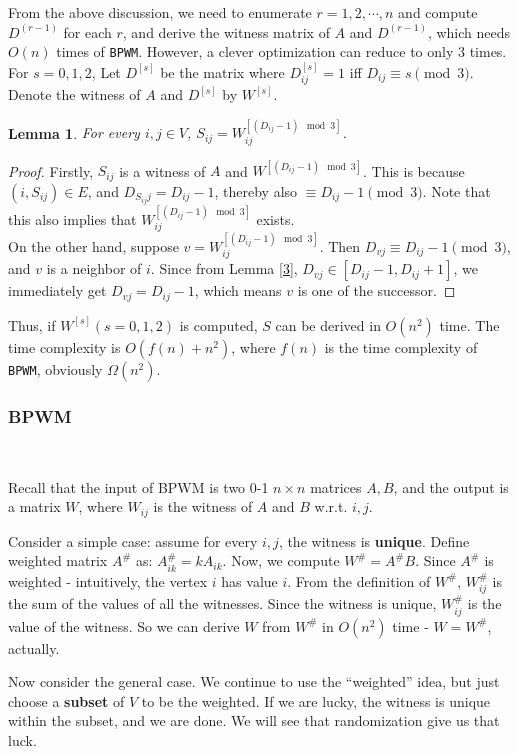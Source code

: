 \documentclass[11pt]{article}
\theoremstyle{plain}
\newtheorem{lemma}{Lemma}[section]
\begin{document}
From the above discussion, we need to enumerate $r=1,2,\cdots,n$ and compute $D^{(r-1)}$ for each $r$, and derive the witness matrix of $A$ and $D^{(r-1)}$, which needs $O(n)$ times of \texttt{BPWM}. However, a clever optimization can reduce to only $3$ times. For $s=0,1,2$, Let $D^{[s]}$ be the matrix where $D^{[s]}_{ij}=1$ iff $D_{ij}\equiv s\pmod 3$. Denote the witness of $A$ and $D^{[s]}$ by $W^{[s]}$.

\begin{lemma}
\label{5}
For every $i,j\in V$, $S_{ij}=W^{[(D_{ij}-1)\mod 3]}_{ij}$.
\end{lemma}
\begin{proof}
Firstly, $S_{ij}$ is a witness of $A$ and $W^{[(D_{ij}-1)\mod 3]}$. This is because $(i,S_{ij})\in E$, and $D_{S_{ij}j}=D_{ij}-1$, thereby also $\equiv D_{ij}-1\pmod 3$. Note that this also implies that $W^{[(D_{ij}-1)\mod 3]}_{ij}$ exists.\\
On the other hand, suppose $v=W^{[(D_{ij}-1)\mod 3]}_{ij}$. Then $D_{vj}\equiv D_{ij}-1\pmod 3$, and $v$ is a neighbor of $i$. Since from Lemma \ref{3}, $D_{vj}\in [D_{ij}-1,D_{ij}+1]$, we immediately get $D_{vj}=D_{ij}-1$, which means $v$ is one of the successor.
\end{proof}

Thus, if $W^{[s]}(s=0,1,2)$ is computed, $S$ can be derived in $O(n^2)$ time. The time complexity is $O(f(n)+n^2)$, where $f(n)$ is the time complexity of \texttt{BPWM}, obviously $\Omega(n^2)$.

\subsubsection{BPWM}
\label{sec:bpwm}\

Recall that the input of BPWM is two 0-1 $n\times n$ matrices $A,B$, and the output is a matrix $W$, where $W_{ij}$ is the witness of $A$ and $B$ w.r.t. $i,j$.

Consider a simple case: assume for every $i,j$, the witness is \textbf{unique}. Define weighted matrix $A^{\#}$ as: $A^{\#}_{ik}=kA_{ik}$. Now, we compute $W^{\#}=A^{\#}B$. Since $A^{\#}$ is weighted - intuitively, the vertex $i$ has value $i$. From the definition of $W^{\#}$, $W^{\#}_{ij}$ is the sum of the values of all the witnesses. Since the witness is unique, $W^{\#}_{ij}$ is the value of the witness. So we can derive $W$ from $W^{\#}$ in $O(n^2)$ time - $W=W^{\#}$, actually.

Now consider the general case. We continue to use the ``weighted'' idea, but just choose a \textbf{subset} of $V$ to be the weighted. If we are lucky, the witness is unique within the subset, and we are done. We will see that randomization give us that luck.
\end{document}
